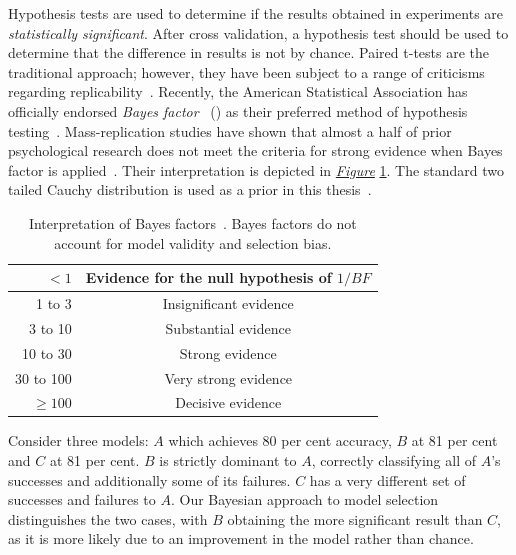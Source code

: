 \documentclass[12pt, twoside]{book}
\renewcommand\emph[1]{\textit{\color{USred}{#1}}}
\begin{document}
Hypothesis tests are used to determine if the results obtained in experiments are \textit{statistically significant}. After cross validation, a hypothesis test should be used to determine that the difference in results is not by chance. Paired t-tests are the traditional approach; however, they have been subject to a range of criticisms regarding replicability~\cite{publicationbias, replicability}. Recently, the American Statistical Association has officially endorsed \textit{Bayes factor}~\cite{bayesianttests} (\emph{BF}) as their preferred method of hypothesis testing~\cite{bayesfactorASA}. Mass-replication studies have shown that almost a half of prior psychological research does not meet the criteria for strong evidence when Bayes factor is applied~\cite{bayesfactorempirical}. Their interpretation is depicted in \textit{\hyperref[bayesfactorinterpretation]{Figure}} \ref{bayesfactorinterpretation}. The standard two tailed Cauchy distribution is used as a prior in this thesis~\cite{bayesianttests}.


\begin{table}[!htb]
	\caption{Interpretation of Bayes factors~\cite{bayesfactorinterpretation}. Bayes factors do not account for model validity and selection bias.}
	\label{bayesfactorinterpretation}
	\centering
\begin{tabular}{@{}rc@{}}
	$<1$ &  Evidence for the null hypothesis of $1/BF$\\ \midrule
	1 to 3 &  Insignificant evidence\\ \midrule
	3 to 10 & Substantial evidence \\ \midrule
	10 to 30    & Strong evidence    \\\midrule
	30 to 100 & Very strong evidence\\\midrule
	$\geq 100$ & Decisive evidence \\\midrule
\end{tabular}
\end{table}


Consider three models: $A$ which achieves 80 per cent accuracy, $B$ at 81 per cent and $C$ at 81 per cent. $B$ is strictly dominant to $A$, correctly classifying all of $A$'s successes and additionally some of its failures. $C$ has a very different set of successes and failures to $A$. Our Bayesian approach to model selection distinguishes the two cases, with $B$ obtaining the more significant result than $C$, as it is more likely due to an improvement in the model rather than chance. 
\end{document}
